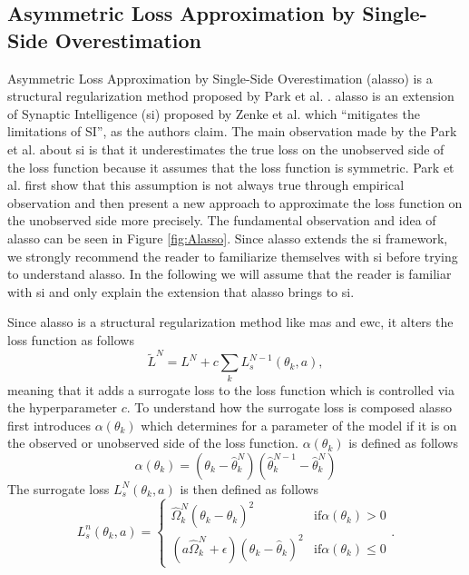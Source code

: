 \subsection{Asymmetric Loss Approximation by Single-Side Overestimation}
\label{sec:Related_work:Continual_Learning:ALASSO}
Asymmetric Loss Approximation by Single-Side Overestimation (\gls{alasso}) is a structural regularization method proposed by Park et al. \cite{park2019continual}.
\gls{alasso} is an extension of Synaptic Intelligence (\gls{si}) proposed by Zenke et al. \cite{zenke2017continual} which \enquote{mitigates the limitations of SI},
as the authors claim. The main observation made by the Park et al. about \gls{si} is that it underestimates the true loss on the unobserved side of the loss
function because it assumes that the loss function is symmetric. Park et al. first show that this assumption is not always true through empirical observation
and then present a new approach to approximate the loss function on the unobserved side more precisely. The fundamental observation and idea of \gls{alasso} can be
seen in Figure \ref{fig:Alasso}. Since \gls{alasso} extends the \gls{si} framework, we strongly recommend the reader to familiarize themselves with \gls{si} before
trying to understand \gls{alasso}. In the following we will assume that the reader is familiar with \gls{si} and only explain the extension that \gls{alasso}
brings to \gls{si}. \par
Since \gls{alasso} is a structural regularization method like \gls{mas} and \gls{ewc}, it alters the loss function as follows
\begin{equation}
    \tilde{L}^N = L^N + c \sum_k L_s^{N-1}(\theta_k,a),
\end{equation}
meaning that it adds a surrogate loss to the loss function which is controlled via the hyperparameter $c$. To understand how the surrogate loss is composed
\gls{alasso} first introduces $\alpha(\theta_k)$ which determines for a parameter of the model if it is on the observed or unobserved side of the loss function.
$\alpha(\theta_k)$ is defined as follows
\begin{equation}
    \alpha(\theta_k) = (\theta_k - \hat{\theta}^N_k) (\hat{\theta}^{N-1}_k - \hat{\theta}^N_k)
\end{equation}
The surrogate loss $L^N_s(\theta_k,a)$ is then defined as follows
\begin{equation}
    L_s^n(\theta_k,a) = \begin{cases} \hat{\Omega}^N_k (\theta_k - \hat{\theta}_k)^2 & \text{if} \alpha(\theta_k) > 0 \\
    (a \hat{\Omega}^N_k + \epsilon)(\theta_k - \hat{\theta}_k)^2 & \text{if} \alpha(\theta_k) \leq 0 \end{cases}.
\end{equation}
